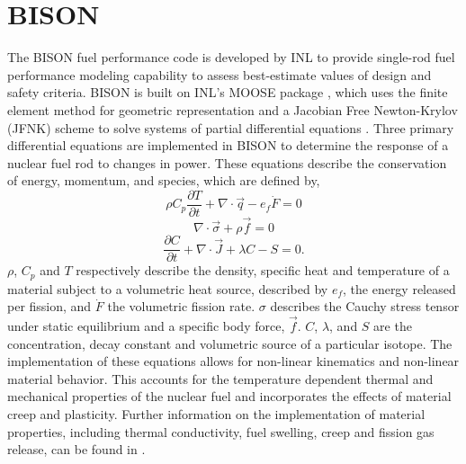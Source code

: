 \documentclass[edeposit,fullpage,11pt]{uiucthesis2009}
\begin{document}
\section{BISON}

The BISON fuel performance code is developed by \gls{INL} to provide single-rod fuel performance modeling capability to assess best-estimate values of design and safety criteria. 
BISON is built on \gls{INL}'s \gls{MOOSE} package \cite{gaston_moose:_2009}, which uses the finite element method for geometric representation and a Jacobian Free Newton-Krylov (JFNK) scheme to solve systems of partial differential equations \cite{williamson_multidimensional_2012}. 
Three primary differential equations are implemented in BISON to determine the response of a nuclear fuel rod to changes in  power.
These equations describe the conservation of energy, momentum, and species, which are defined by,
\begin{equation} \label{eqn:bis_eng}
\rho C_p \frac{\partial T}{\partial t} + \nabla \cdot \vec{q} - e_f \dot{F} =0
\end{equation} 
\begin{equation} \label{eqn:bis_mom}
\nabla \cdot \vec{\sigma} + \rho \vec{f} =0
\end{equation} 
\begin{equation} \label{eqn:bis_spec}
\frac{\partial C}{\partial t} + \nabla \cdot \vec{J} +\lambda C - S =0.
\end{equation} 
$\rho$, $C_p$ and $T$ respectively describe the density, specific heat and temperature of a material subject to a volumetric heat source, described by $e_f$, the energy released per fission, and $\dot{F}$ the volumetric fission rate.
$\sigma$ describes the Cauchy stress tensor under static equilibrium and a specific body force, $\vec{f}$.
$C$, $\lambda$, and $S$ are the concentration, decay constant and volumetric source of a particular isotope.
The implementation of these equations allows for non-linear kinematics and non-linear material behavior.
This accounts for the temperature dependent thermal and mechanical properties of the nuclear fuel and incorporates the effects of material creep and plasticity.
Further information on the implementation of material properties, including thermal conductivity, fuel swelling, creep and fission gas release, can be found in \cite{williamson_validating_2016,hales_bison_2015}.
\end{document}
